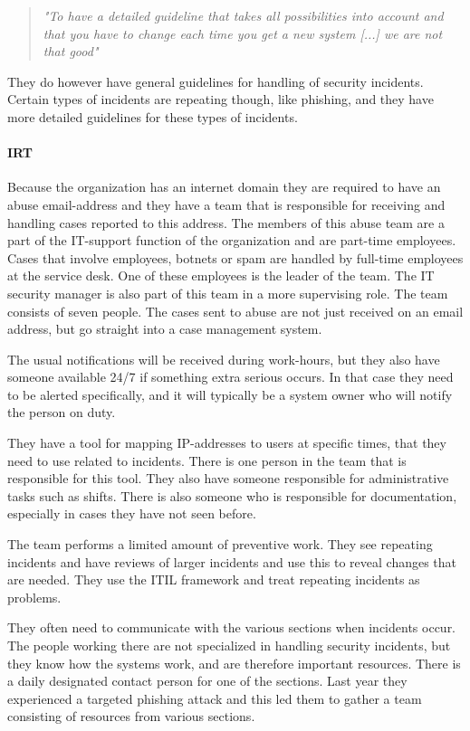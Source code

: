 \begin{quote}
\textit{"To have a detailed guideline that takes all possibilities into account and that you have to change each time you get a new system %
[...] we are not that good"}
\end{quote}

They do however have general guidelines for handling of security incidents. Certain types of incidents are repeating though, like phishing, and they have more detailed guidelines for these types of incidents.

\paragraph{\acl{IRT}}
Because the organization has an internet domain they are required to have an abuse email-address and they have a team that is responsible for receiving and handling cases reported to this address. The members of this abuse team are a part of the IT-support function of the organization and are part-time employees. Cases that involve employees, botnets or spam are handled by full-time employees at the service desk. One of these employees is the leader of the team. The IT security manager is also part of this team in a more supervising role. The team consists of seven people. The cases sent to abuse are not just received on an email address, but go straight into a case management system. 

The usual notifications will be received during work-hours, but they also have someone available 24/7 if something extra serious occurs. In that case they need to be alerted specifically, and it will typically be a system owner who will notify the person on duty.

They have a tool for mapping IP-addresses to users at specific times, that they need to use related to incidents. There is one person in the team that is responsible for this tool. They also have someone responsible for administrative tasks such as shifts. There is also someone who is responsible for documentation, especially in cases they have not seen before.

The team performs a limited amount of preventive work. They see repeating incidents and have reviews of larger incidents and use this to reveal changes that are needed. They use the \ac{ITIL} framework and treat repeating incidents as problems.

They often need to communicate with the various sections when incidents occur. The people working there are not specialized in handling security incidents, but they know how the systems work, and are therefore important resources. There is a daily designated contact person for one of the sections. Last year they experienced a targeted phishing attack and this led them to gather a team consisting of resources from various sections.

